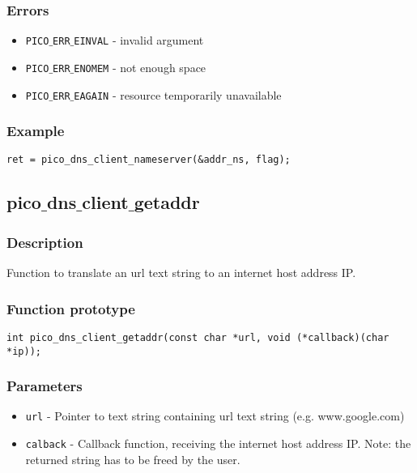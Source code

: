 \subsubsection*{Errors}
\begin{itemize}[noitemsep]
\item \texttt{PICO$\_$ERR$\_$EINVAL} - invalid argument
\item \texttt{PICO$\_$ERR$\_$ENOMEM} - not enough space
\item \texttt{PICO$\_$ERR$\_$EAGAIN} - resource temporarily unavailable
\end{itemize}

\subsubsection*{Example}
\begin{verbatim}
ret = pico_dns_client_nameserver(&addr_ns, flag);
\end{verbatim}



\subsection{pico$\_$dns$\_$client$\_$getaddr}

\subsubsection*{Description}
Function to translate an url text string to an internet host address IP. 

\subsubsection*{Function prototype}
\begin{verbatim}
int pico_dns_client_getaddr(const char *url, void (*callback)(char *ip));
\end{verbatim}

\subsubsection*{Parameters}
\begin{itemize}[noitemsep]
\item \texttt{url} - Pointer to text string containing url text string (e.g. www.google.com)
\item \texttt{calback} - Callback function, receiving the internet host address IP. Note: the returned string has to be freed by the user.
\end{itemize}

